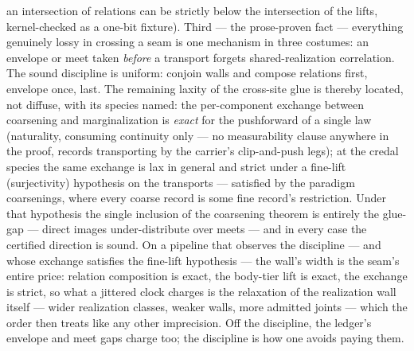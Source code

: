 an intersection of relations can be strictly below the
intersection of the lifts, kernel-checked as a one-bit fixture).
Third --- the prose-proven fact --- everything genuinely lossy in
crossing a seam is one
mechanism in three costumes: an envelope or meet taken
\emph{before} a transport forgets shared-realization correlation.
The sound discipline is uniform: conjoin walls and compose
relations first, envelope once, last. The remaining laxity of the
cross-site glue is thereby located, not diffuse, with its species
named: the per-component exchange between coarsening and
marginalization is \emph{exact} for the pushforward of a single law
(naturality, consuming continuity only --- no measurability clause
anywhere in the proof, records transporting by the carrier's
clip-and-push legs); at the credal species the same exchange is lax
in general and strict under a fine-lift (surjectivity)
hypothesis on the transports --- satisfied by the paradigm
coarsenings, where every coarse record is some fine record's
restriction. Under that hypothesis the single inclusion of the
coarsening theorem is entirely the glue-gap --- direct images
under-distribute over meets --- and in every case the certified
direction is sound. On a pipeline that observes the discipline ---
and whose exchange satisfies the fine-lift hypothesis --- the wall's
width is the seam's entire price: relation composition is exact, the
body-tier lift is exact, the exchange is strict, so what a jittered
clock charges is the relaxation of the realization wall itself ---
wider realization classes, weaker walls, more admitted joints ---
which the order then treats like any other imprecision. Off the
discipline, the ledger's envelope and meet gaps charge too; the
discipline is how one avoids paying them.

